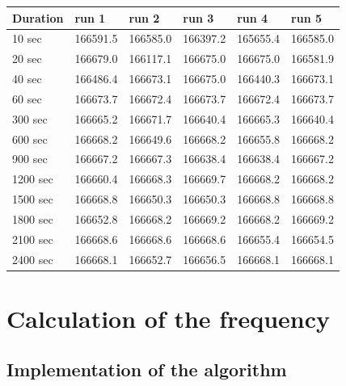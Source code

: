 \documentclass[12pt, a4paper]{report}
\begin{document}
    \begin{table}[H]
        \begin{tabular}{|l|l|l|l|l|l|}
        \hline
        Duration & run 1 & run 2 & run 3 & run 4 & run 5 \\ \hline
        10 sec        & 166591.5                 & 166585.0     & 166397.2     & 165655.4      & 166585.0      \\ \hline
        20 sec     & 166679.0                 & 166117.1      & 166675.0    & 166675.0      & 166581.9  \\ \hline
        40 sec      & 166486.4                 & 166673.1    & 166675.0     & 166440.3    & 166673.1    \\ \hline
        60 sec      & 166673.7                 & 166672.4	   & 166673.7	  & 166672.4	  & 166673.7  \\ \hline
        300 sec      & 166665.2                 & 166671.7	   & 166640.4	  & 166665.3	  & 166640.4      \\ \hline
        600 sec      & 166668.2                 & 166649.6	   & 166668.2	  & 166655.8	  & 166668.2      \\ \hline
        900 sec      & 166667.2                 & 166667.3	   & 166638.4	  & 166638.4	  & 166667.2      \\ \hline
        1200 sec      & 166660.4                 & 166668.3	   & 166669.7	  & 166668.2	  & 166668.2      \\ \hline
        1500 sec      & 166668.8                 & 166650.3	   & 166650.3	  & 166668.8	  & 166668.8      \\ \hline
        1800 sec      & 166652.8                 & 166668.2	   & 166669.2	  & 166668.2	  & 166669.2      \\ \hline
        2100 sec      & 166668.6                 & 166668.6	   & 166668.6	  & 166655.4	  & 166654.5      \\ \hline
        2400 sec      & 166668.1                 & 166652.7	   & 166656.5	  & 166668.1	  & 166668.1        \\ \hline
    \end{tabular}
    \end{table}
     
    \chapter{Calculation of the frequency}
    
    \section{Implementation of the algorithm}
    
\end{document}
